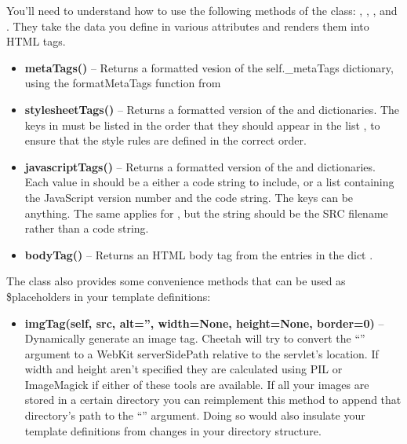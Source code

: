You'll need to understand how to use the following methods of the
 class: , ,
, and .  They take the data you
define in various attributes and renders them into HTML tags.

\begin{itemize}
\item {\bf metaTags()} -- Returns a formatted vesion of the self._metaTags
     dictionary, using the formatMetaTags function from 
\item {\bf stylesheetTags()} -- Returns a formatted version of the
      and  dictionaries.  The
     keys in  must be listed in the order that they
     should appear in the list , to ensure that the
     style rules are defined in the correct order.
\item {\bf javascriptTags()} -- Returns a formatted version of the
      and  dictionaries.
     Each value in  should be a either a code string
     to include, or a list containing the JavaScript version number and the code
     string. The keys can be anything.  The same applies for
     , but the string should be the SRC filename
     rather than a code string.
\item {\bf bodyTag()} -- Returns an HTML body tag from the entries in the dict
     .
\end{itemize}

The class also provides some convenience methods that can be used as
\$placeholders in your template definitions:

\begin{itemize}
\item {\bf imgTag(self, src, alt='', width=None, height=None, border=0)} --
     Dynamically generate an image tag.  Cheetah will try to convert the
     ``'' argument to a WebKit serverSidePath relative to the
     servlet's location. If width and height aren't specified they are
     calculated using PIL or ImageMagick if either of these tools are available.
     If all your images are stored in a certain directory you can reimplement
     this method to append that directory's path to the ``'' argument.
     Doing so would also insulate your template definitions from changes in your
     directory structure.
\end{itemize}

